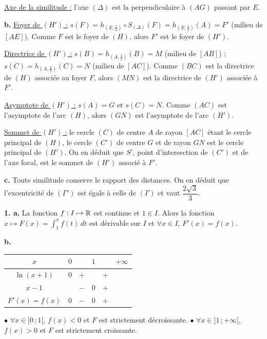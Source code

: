 \documentclass[11pt]{article}
\begin{document}
\underline{Axe de la similitude :} l'axe $(\Delta)$ est la perpendiculaire à $(AG)$ passant par $E$.

\textbf{b.} \underline{Foyer de $(H')$ :} $s(F) = h_{(E,\frac{1}{2})} \circ S_{(\Delta)}(F) = h_{(E,\frac{1}{2})}(A) = F'$ (milieu de $[AE]$). Comme $F$ est le foyer de $(H)$, alors $F'$ est le foyer de $(H')$.

\underline{Directrice de $(H')$ :} $s(B) = h_{(A,\frac{1}{2})}(B) = M$ (milieu de $[AB]$) ; $s(C) = h_{(A,\frac{1}{2})}(C) = N$ (milieu de $[AC]$). Comme $(BC)$ est la directrice de $(H)$ associée au foyer $F$, alors $(MN)$ est la directrice de $(H')$ associée à $F'$.

\underline{Asymptote de $(H')$ :} $s(A) = G$ et $s(C) = N$. Comme $(AC)$ est l'asymptote de l'arc $(H)$, alors $(GN)$ est l'asymptote de l'arc $(H')$.

\underline{Sommet de $(H')$ :} le cercle $(C)$ de centre $A$ de rayon $[AC]$ étant le cercle principal de $(H)$, le cercle $(C')$ de centre $G$ et de rayon $GN$ est le cercle principal de $(H')$. On en déduit que $S'$, point d'intersection de $(C')$ et de l'axe focal, est le sommet de $(H')$ associé à $F'$.

\textbf{c.} Toute similitude conserve le rapport des distances. On en déduit que l'excentricité de $(\Gamma')$ est égale à celle de $(\Gamma)$ et vaut $\dfrac{2\sqrt{3}}{3}$.


\textbf{1. a.} La fonction $f : I \mapsto \mathbb{R}$ est continue et $1 \in I$. Alors la fonction $x \mapsto F(x) = \displaystyle\int_1^x f(t)\,dt$ est dérivable sur $I$ et $\forall x \in I$, $F'(x) = f(x)$.

\textbf{b.}
\begin{center}\renewcommand{\arraystretch}{1.4}
\begin{tabular}{|c|ccccc|}
\hline
$x$ & $0$ & & $1$ & & $+\infty$ \\
\hline
$\ln(x+1)$ & $0$ & $+$ & & $+$ & \\
\hline
$x - 1$ & & $-$ & $0$ & $+$ & \\
\hline
$F'(x) = f(x)$ & $0$ & $-$ & $0$ & $+$ & \\
\hline
\end{tabular}
\end{center}
$\bullet$ $\forall x \in ]0\,;1[$, $f(x) < 0$ et $F$ est strictement décroissante. $\bullet$ $\forall x \in ]1\,;+\infty[$, $f(x) > 0$ et $F$ est strictement croissante.
\end{document}
